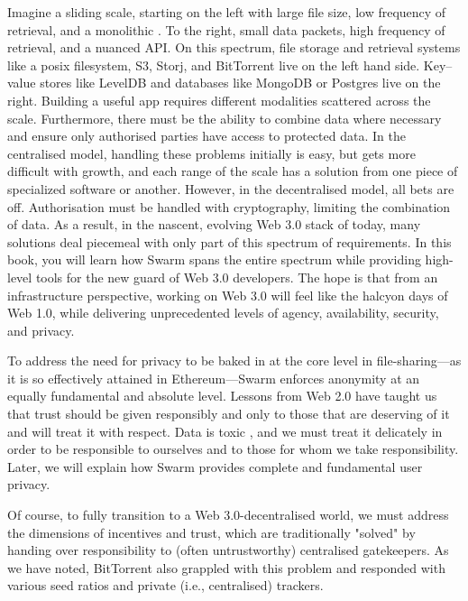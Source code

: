 Imagine a sliding scale, starting on the left with large file size, low frequency of retrieval, and a monolithic . To the right, small data packets, high frequency of retrieval, and a nuanced API. On this spectrum, file storage and retrieval systems like a posix filesystem, S3, Storj, and BitTorrent live on the left hand side. Key--value stores like LevelDB and databases like MongoDB or Postgres live on the right. Building a useful app requires different modalities scattered across the scale. Furthermore, there must be the ability to combine data where necessary and ensure only authorised parties have access to protected data. In the centralised model, handling these problems initially is easy, but gets more difficult with growth, and each range of the scale has a solution from one piece of specialized software or another. However, in the decentralised model, all bets are off. Authorisation must be handled with cryptography, limiting the combination of data. As a result, in the nascent, evolving Web 3.0 stack of today, many solutions deal piecemeal with only part of this spectrum of requirements. In this book, you will learn how Swarm spans the entire spectrum while providing high-level tools for the new guard of Web 3.0 developers. The hope is that from an infrastructure perspective, working on Web 3.0 will feel like the halcyon days of Web 1.0, while delivering unprecedented levels of agency, availability, security, and privacy.

To address the need for privacy to be baked in at the core level in file-sharing—as it is so effectively attained in Ethereum—Swarm enforces anonymity at an equally fundamental and absolute level. Lessons from Web 2.0 have taught us that trust should be given responsibly and only to those that are deserving of it and will treat it with respect. Data is toxic \cite{schneier2019Jul}, and we must treat it delicately in order to be responsible to ourselves and to those for whom we take responsibility. Later, we will explain how Swarm provides complete and fundamental user privacy.

Of course, to fully transition to a Web 3.0-decentralised world, we must address the dimensions of incentives and trust, which are traditionally "solved" by handing over responsibility to (often untrustworthy) centralised gatekeepers. As we have noted, BitTorrent also grappled with this problem and responded with various seed ratios and private (i.e., centralised) trackers.

